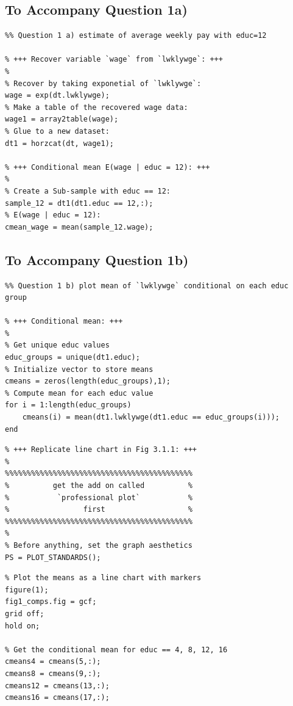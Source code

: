 \documentclass[9pt]{tufte-handout}
\begin{document}
\subsection{To Accompany Question 1a)}
\begin{lstlisting}
%% Question 1 a) estimate of average weekly pay with educ=12

% +++ Recover variable `wage` from `lwklywge`: +++
%
% Recover by taking exponetial of `lwklywge`:
wage = exp(dt.lwklywge);
% Make a table of the recovered wage data:
wage1 = array2table(wage);
% Glue to a new dataset:
dt1 = horzcat(dt, wage1);

% +++ Conditional mean E(wage | educ = 12): +++
%
% Create a Sub-sample with educ == 12:
sample_12 = dt1(dt1.educ == 12,:);
% E(wage | educ = 12):
cmean_wage = mean(sample_12.wage);
\end{lstlisting}
\newpage
\subsection{To Accompany Question 1b)}
\vspace{2cm}
\begin{lstlisting}
%% Question 1 b) plot mean of `lwklywge` conditional on each educ group

% +++ Conditional mean: +++
%
% Get unique educ values
educ_groups = unique(dt1.educ);
% Initialize vector to store means
cmeans = zeros(length(educ_groups),1);
% Compute mean for each educ value
for i = 1:length(educ_groups)
    cmeans(i) = mean(dt1.lwklywge(dt1.educ == educ_groups(i)));
end
\end{lstlisting}
\vspace{0.8cm}
\begin{lstlisting}
% +++ Replicate line chart in Fig 3.1.1: +++
%
%%%%%%%%%%%%%%%%%%%%%%%%%%%%%%%%%%%%%%%%%%%
%          get the add on called          %
%           `professional plot`           %
%                 first                   %
%%%%%%%%%%%%%%%%%%%%%%%%%%%%%%%%%%%%%%%%%%%
%
% Before anything, set the graph aesthetics
PS = PLOT_STANDARDS();
\end{lstlisting}
\vspace{0.8cm}
\begin{lstlisting}
% Plot the means as a line chart with markers
figure(1);
fig1_comps.fig = gcf;
grid off;
hold on;

% Get the conditional mean for educ == 4, 8, 12, 16
cmeans4 = cmeans(5,:);
cmeans8 = cmeans(9,:);
cmeans12 = cmeans(13,:);
cmeans16 = cmeans(17,:);
\end{lstlisting}
\end{document}

